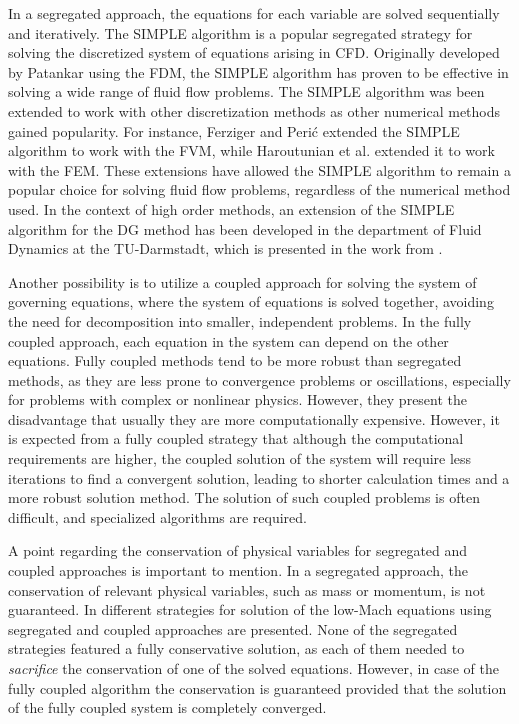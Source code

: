 In a segregated approach, the equations for each variable are solved sequentially and iteratively. The \gls{SIMPLE} algorithm is a popular segregated strategy for solving the discretized system of equations arising in \gls{CFD}. Originally developed by Patankar \parencite{patankarNumericalHeatTransfer1980} using the \gls{FDM}, the SIMPLE algorithm has proven to be effective in solving a wide range of fluid flow problems. The SIMPLE algorithm was been extended to work with other discretization methods as other numerical methods gained popularity. For instance, Ferziger and Perić \parencite{ferzigerComputationalMethodsFluid2002} extended the SIMPLE algorithm to work with the \gls{FVM}, while Haroutunian et al. \parencite{haroutunianSegregatedFiniteElement1993} extended it to work with the \gls{FEM}. These extensions have allowed the SIMPLE algorithm to remain a popular choice for solving fluid flow problems, regardless of the numerical method used. In the context of high order methods, an extension of the SIMPLE algorithm for the DG method has been developed in the department of Fluid Dynamics at the TU-Darmstadt, which is presented in the work from \textcite{kleinHighorderDiscontinuousGalerkin2015}. 

Another possibility is to utilize a coupled approach for solving the system of governing equations, where the system of equations is solved together, avoiding the need for decomposition into smaller, independent problems. In the fully coupled approach, each equation in the system can depend on the other equations. Fully coupled methods tend to be more robust than segregated methods, as they are less prone to convergence problems or oscillations, especially for problems with complex or nonlinear physics. However, they present the disadvantage that usually they are more computationally expensive. However, it is expected from a fully coupled strategy that although the computational requirements are higher, the coupled solution of the system will require less iterations to find a convergent solution, leading to shorter calculation times and a more robust solution method.  The solution of such coupled problems is often difficult, and specialized algorithms are required. 

A point regarding the conservation of physical variables for segregated and coupled approaches is important to mention. In a segregated approach, the conservation of relevant physical variables, such as mass or momentum, is not guaranteed. In \textcite{knikkerComparativeStudyHighorder2011} different strategies for solution of the low-Mach equations using segregated and coupled approaches are presented. None of the segregated strategies featured a fully conservative solution, as each of them needed to \textit{sacrifice} the conservation of one of the solved equations. However, in case of the fully coupled algorithm the conservation is guaranteed provided that the solution of the fully coupled system is completely converged.

